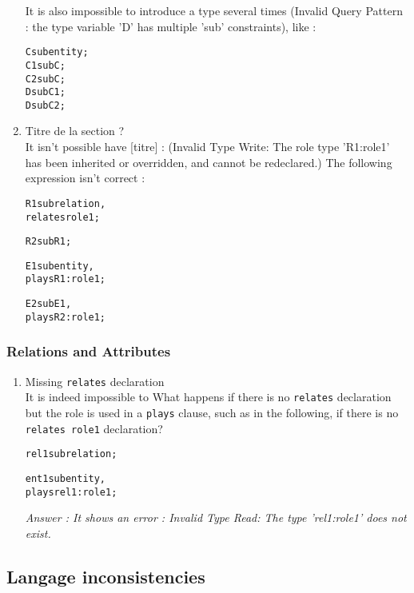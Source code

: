 \documentclass[runningheads]{llncs}
\begin{document}
\begin{enumerate}
It is also impossible to introduce a type several times (Invalid Query Pattern : the type variable 'D' has multiple 'sub' constraints), like :

  \begin{alltt}
    C sub entity;
    C1 sub C;
    C2 sub C;
    D sub C1;
    D sub C2;
  \end{alltt}


\item Titre de la section ?\\
It isn't possible have [titre] : (Invalid Type Write: The role type 'R1:role1' has been inherited or overridden, and cannot be redeclared.) The following expression isn't correct :

\begin{alltt}
     R1 sub relation,
     relates role1;
    
     R2 sub R1;
      
    E1 sub entity,
    plays R1:role1;
    
    E2 sub E1,
    plays R2:role1;
  \end{alltt}

\end{enumerate}


\subsubsection{Relations and Attributes}

\begin{enumerate}
\item Missing \texttt{relates} declaration \\

It is indeed impossible to  What happens if there is no
  \texttt{relates} declaration but the role is used in a \texttt{plays}
  clause, such as in the following, if there is no \texttt{relates role1}
  declaration?

  \begin{alltt}
rel1 sub relation;

ent1 sub entity,
  plays rel1:role1;
  \end{alltt}

\emph{Answer : It shows an error : Invalid Type Read: The type 'rel1:role1' does not exist. }

\end{enumerate}


\subsection{Langage inconsistencies}





























\end{document}

